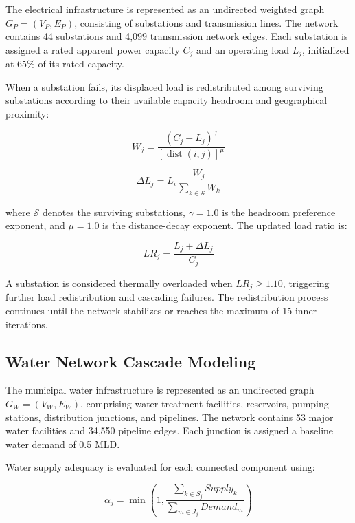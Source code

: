 \documentclass[oneside]{ieeeaccess}
\begin{document}
The electrical infrastructure is represented as an undirected weighted graph $G_P=(V_P,E_P)$, consisting of substations and transmission lines. The network contains 44 substations and 4,099 transmission network edges. Each substation is assigned a rated apparent power capacity $C_j$ and an operating load $L_j$, initialized at 65\% of its rated capacity.

When a substation fails, its displaced load is redistributed among surviving substations according to their available capacity headroom and geographical proximity:

\begin{equation}
W_j=\frac{(C_j-L_j)^\gamma}
{[\operatorname{dist}(i,j)]^\mu}
\label{eq:weight}
\end{equation}

\begin{equation}
\Delta L_j=L_i
\frac{W_j}{\sum_{k\in\mathcal{S}}W_k}
\label{eq:redistribution}
\end{equation}

where $\mathcal{S}$ denotes the surviving substations, $\gamma=1.0$ is the headroom preference exponent, and $\mu=1.0$ is the distance-decay exponent. The updated load ratio is:

\begin{equation}
LR_j=\frac{L_j+\Delta L_j}{C_j}
\label{eq:loadratio}
\end{equation}

A substation is considered thermally overloaded when $LR_j\geq1.10$, triggering further load redistribution and cascading failures. The redistribution process continues until the network stabilizes or reaches the maximum of 15 inner iterations.

\subsection{Water Network Cascade Modeling}

The municipal water infrastructure is represented as an undirected graph $G_W=(V_W,E_W)$, comprising water treatment facilities, reservoirs, pumping stations, distribution junctions, and pipelines. The network contains 53 major water facilities and 34,550 pipeline edges. Each junction is assigned a baseline water demand of 0.5 MLD.

Water supply adequacy is evaluated for each connected component using:

\begin{equation}
\alpha_j=\min\left(1,
\frac{\sum_{k\in S_j}Supply_k}
{\sum_{m\in J_j}Demand_m}\right)
\label{eq:adequacy}
\end{equation}
\end{document}
